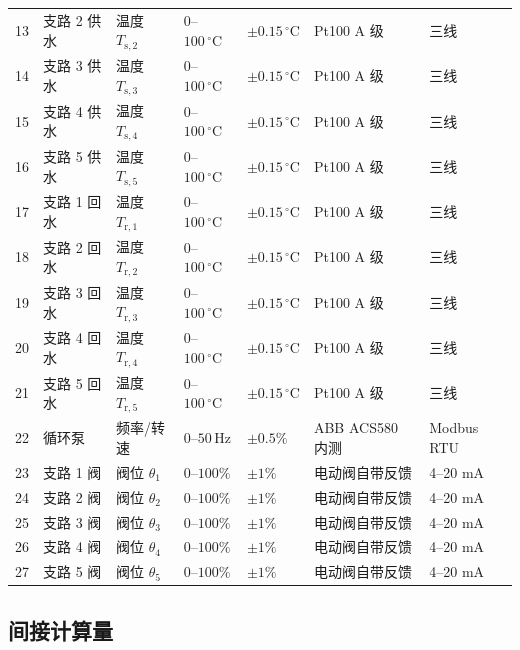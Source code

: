 \documentclass[11pt,a4paper]{ctexart}
\begin{document}
\begin{longtable}{clp{2.6cm}p{1.8cm}p{2.0cm}p{3.0cm}p{2.2cm}}
13 & 支路 2 供水 & 温度 $T_{\mathrm{s},2}$ & $0$--$100\,\mathrm{^\circ C}$ & $\pm 0.15\,\mathrm{^\circ C}$ & Pt100 A 级 & 三线 \\
14 & 支路 3 供水 & 温度 $T_{\mathrm{s},3}$ & $0$--$100\,\mathrm{^\circ C}$ & $\pm 0.15\,\mathrm{^\circ C}$ & Pt100 A 级 & 三线 \\
15 & 支路 4 供水 & 温度 $T_{\mathrm{s},4}$ & $0$--$100\,\mathrm{^\circ C}$ & $\pm 0.15\,\mathrm{^\circ C}$ & Pt100 A 级 & 三线 \\
16 & 支路 5 供水 & 温度 $T_{\mathrm{s},5}$ & $0$--$100\,\mathrm{^\circ C}$ & $\pm 0.15\,\mathrm{^\circ C}$ & Pt100 A 级 & 三线 \\
17 & 支路 1 回水 & 温度 $T_{\mathrm{r},1}$ & $0$--$100\,\mathrm{^\circ C}$ & $\pm 0.15\,\mathrm{^\circ C}$ & Pt100 A 级 & 三线 \\
18 & 支路 2 回水 & 温度 $T_{\mathrm{r},2}$ & $0$--$100\,\mathrm{^\circ C}$ & $\pm 0.15\,\mathrm{^\circ C}$ & Pt100 A 级 & 三线 \\
19 & 支路 3 回水 & 温度 $T_{\mathrm{r},3}$ & $0$--$100\,\mathrm{^\circ C}$ & $\pm 0.15\,\mathrm{^\circ C}$ & Pt100 A 级 & 三线 \\
20 & 支路 4 回水 & 温度 $T_{\mathrm{r},4}$ & $0$--$100\,\mathrm{^\circ C}$ & $\pm 0.15\,\mathrm{^\circ C}$ & Pt100 A 级 & 三线 \\
21 & 支路 5 回水 & 温度 $T_{\mathrm{r},5}$ & $0$--$100\,\mathrm{^\circ C}$ & $\pm 0.15\,\mathrm{^\circ C}$ & Pt100 A 级 & 三线 \\
22 & 循环泵 & 频率/转速 & $0$--$50\,\mathrm{Hz}$ & $\pm 0.5\%$ & ABB ACS580 内测 & Modbus RTU \\
23 & 支路 1 阀 & 阀位 $\theta_1$ & $0$--$100\%$ & $\pm 1\%$ & 电动阀自带反馈 & 4--20 mA \\
24 & 支路 2 阀 & 阀位 $\theta_2$ & $0$--$100\%$ & $\pm 1\%$ & 电动阀自带反馈 & 4--20 mA \\
25 & 支路 3 阀 & 阀位 $\theta_3$ & $0$--$100\%$ & $\pm 1\%$ & 电动阀自带反馈 & 4--20 mA \\
26 & 支路 4 阀 & 阀位 $\theta_4$ & $0$--$100\%$ & $\pm 1\%$ & 电动阀自带反馈 & 4--20 mA \\
27 & 支路 5 阀 & 阀位 $\theta_5$ & $0$--$100\%$ & $\pm 1\%$ & 电动阀自带反馈 & 4--20 mA \\
\end{longtable}

\subsection{间接计算量}
\end{document}
